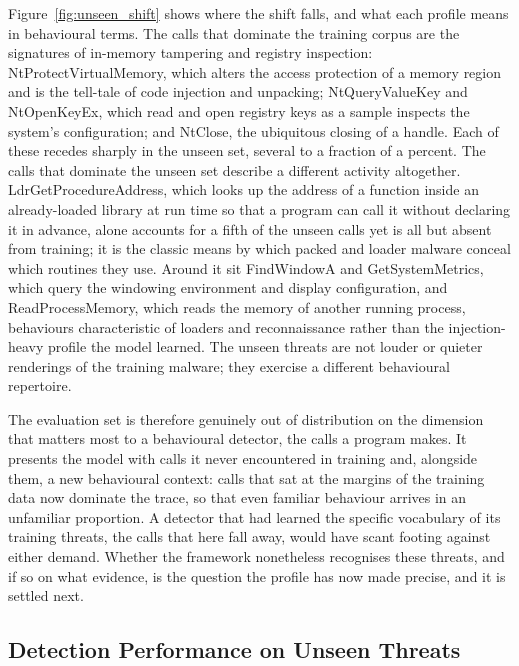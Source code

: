 \documentclass[%
    BCOR=10mm,
    DIV=13,
    toc=bibliography,
    toc=listof,
    oneside,
    12pt,
]{scrbook}
\begin{document}
Figure~\ref{fig:unseen_shift} shows where the shift falls, and what each profile
means in behavioural terms. The calls that dominate the training corpus are the
signatures of in-memory tampering and registry inspection: NtProtectVirtualMemory,
which alters the access protection of a memory region and is the tell-tale of code
injection and unpacking; NtQueryValueKey and NtOpenKeyEx, which read and open
registry keys as a sample inspects the system's configuration; and NtClose, the
ubiquitous closing of a handle. Each of these recedes sharply in the unseen set,
several to a fraction of a percent. The calls that dominate the unseen set describe
a different activity altogether. LdrGetProcedureAddress, which looks up the address
of a function inside an already-loaded library at run time so that a program can
call it without declaring it in advance, alone accounts for a fifth of the unseen
calls yet is all but absent from training; it is the classic means by which packed
and loader malware conceal which routines they use. Around it sit FindWindowA and
GetSystemMetrics, which query the windowing environment and display configuration,
and ReadProcessMemory, which reads the memory of another running process,
behaviours characteristic of loaders and reconnaissance rather than the
injection-heavy profile the model learned. The unseen threats are not louder or
quieter renderings of the training malware; they exercise a different behavioural
repertoire.

The evaluation set is therefore genuinely out of distribution on the dimension that
matters most to a behavioural detector, the calls a program makes. It presents the
model with calls it never encountered in training and, alongside them, a new
behavioural context: calls that sat at the margins of the training data now
dominate the trace, so that even familiar behaviour arrives in an unfamiliar
proportion. A detector that had learned the specific
vocabulary of its training threats, the calls that here fall away, would have scant
footing against either demand. Whether the framework nonetheless recognises these
threats, and if so on what evidence, is the question the profile has now made
precise, and it is settled next.

\subsection{Detection Performance on Unseen Threats}
\label{subsec:zeroday_results}
\end{document}
